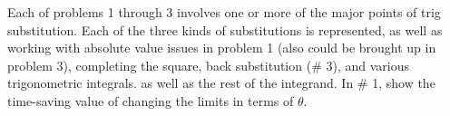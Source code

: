\documentclass[]{ximera}
\begin{document}
\begin{problem}
\end{problem}

\begin{instructorNotes}
Each of problems 1 through 3 involves one or more of the major points of trig substitution.  
Each of the three kinds of substitutions is represented, as well as working with absolute value issues in problem 1 (also could be brought up in problem 3), completing the square, back substitution (\# 3), and various trigonometric integrals.  
 as well as the rest of the integrand.  
In \# 1, show the time-saving value of changing the limits in terms of $\theta$.  
\end{instructorNotes}
\end{document}
